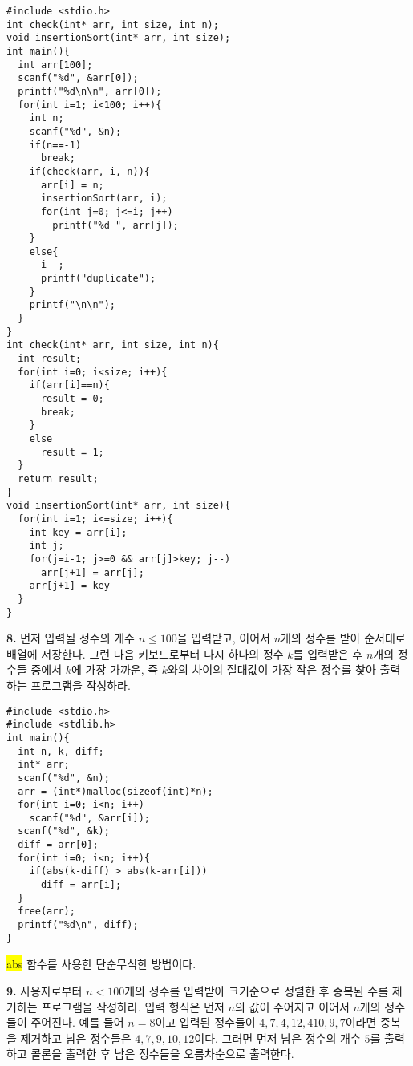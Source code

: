 \documentclass[a4paper,chapter,atbegshi]{oblivoir}
\begin{document}
\begin{lstlisting}[style=C]
#include <stdio.h>
int check(int* arr, int size, int n);
void insertionSort(int* arr, int size);
int main(){
  int arr[100];
  scanf("%d", &arr[0]);
  printf("%d\n\n", arr[0]);
  for(int i=1; i<100; i++){
    int n;
    scanf("%d", &n);
    if(n==-1)
      break;
    if(check(arr, i, n)){
      arr[i] = n;
      insertionSort(arr, i);
      for(int j=0; j<=i; j++)
        printf("%d ", arr[j]);
    }
    else{
      i--;
      printf("duplicate");
    }
    printf("\n\n");
  }
}
int check(int* arr, int size, int n){
  int result;
  for(int i=0; i<size; i++){
    if(arr[i]==n){
      result = 0;
      break;
    }
    else
      result = 1;
  }
  return result;
}
void insertionSort(int* arr, int size){
  for(int i=1; i<=size; i++){
    int key = arr[i];
    int j;
    for(j=i-1; j>=0 && arr[j]>key; j--)
      arr[j+1] = arr[j];
    arr[j+1] = key
  }
}
\end{lstlisting}
\hfill\break
\begin{mdframed}\textbf{8. }
  먼저 입력될 정수의 개수 $n\leq 100$을 입력받고, 이어서 $n$개의 정수를 받아
  순서대로 배열에 저장한다. 그런 다음 키보드로부터 다시 하나의 정수 $k$를
  입력받은 후 $n$개의 정수들 중에서 $k$에 가장 가까운, 즉 $k$와의 차이의
  절대값이 가장 작은 정수를 찾아 출력하는 프로그램을 작성하라. 
\end{mdframed}
\begin{lstlisting}[style=C]
#include <stdio.h>
#include <stdlib.h>
int main(){
  int n, k, diff;
  int* arr;
  scanf("%d", &n);
  arr = (int*)malloc(sizeof(int)*n);
  for(int i=0; i<n; i++)
    scanf("%d", &arr[i]);
  scanf("%d", &k);
  diff = arr[0];
  for(int i=0; i<n; i++){
    if(abs(k-diff) > abs(k-arr[i]))
      diff = arr[i];
  }
  free(arr);
  printf("%d\n", diff);
}
\end{lstlisting}
\colorbox{yellow}{\ttfamily abs} 함수를 사용한 단순무식한 방법이다.
\hfill\break
\begin{mdframed}\textbf{9. }
  사용자로부터 $n<100$개의 정수를 입력받아 크기순으로 정렬한 후 중복된 수를
  제거하는 프로그램을 작성하라. 입력 형식은 먼저 $n$의 값이 주어지고 이어서
  $n$개의 정수들이 주어진다. 예를 들어 $n=8$이고 입력된 정수들이 $4,7,4,12,4
  10,9,7$이라면 중복을 제거하고 남은 정수들은 $4,7,9,10,12$이다. 그러면 먼저
  남은 정수의 개수 $5$를 출력하고 콜론을 출력한 후 남은 정수들을 오름차순으로
  출력한다.
\end{mdframed}
\end{document}
